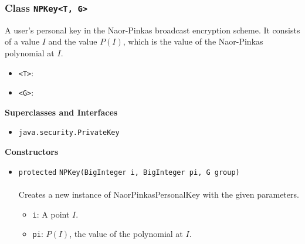 \subsubsection{Class \lstinline|NPKey<T, G>|}
A user's personal key in the Naor-Pinkas broadcast encryption scheme.
 It consists of a value $I$ and the value $P(I)$, which is the value of
 the Naor-Pinkas polynomial at $I$. \\
\noindent\begin{minipage}[t]{5cm}
\vspace{0.3em}
\hspace*{2em}
\vspace{0.3em}
\end{minipage}

\begin{itemize}
\item \lstinline|<T>|: 
\item \lstinline|<G>|: 
\end{itemize}


\textbf{\sffamily Superclasses and Interfaces}
\begin{itemize}
\item \lstinline|java.security.PrivateKey|
\end{itemize}


\textbf{\sffamily Constructors}
\begin{itemize}
\item \lstinline|protected| \lstinline|NPKey|\lstinline|(BigInteger i, BigInteger pi, G group)|\\ \\[-0.6em]
Creates a new instance of NaorPinkasPersonalKey with the given parameters.
\begin{itemize}
\item \lstinline|i|: A point $I$.
\item \lstinline|pi|: $P(I)$, the value of the polynomial at $I$.
\end{itemize}



\end{itemize}


